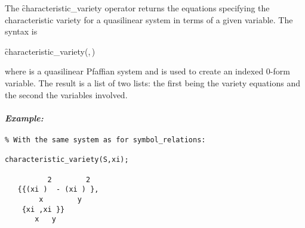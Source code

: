 \hypertarget{operator:CHARACTERISTIC_VARIETY}{}
The \f{characteristic\_variety} operator returns the equations specifying
the characteristic variety for a quasilinear
system in terms of a given variable. The syntax is
\begin{syntax}
  \f{characteristic\_variety}(,\,)
\end{syntax}
where  is a quasilinear Pfaffian system and  is
used to create an indexed 0-form variable. The result is a list of two
lists: the first being the variety equations and the second the variables
involved.

\paragraph{\textit{Example:}}
\begin{verbatim}
% With the same system as for symbol_relations:

characteristic_variety(S,xi);

          2        2
   {{(xi )  - (xi ) },
        x        y
    {xi ,xi }}
       x   y
\end{verbatim}








